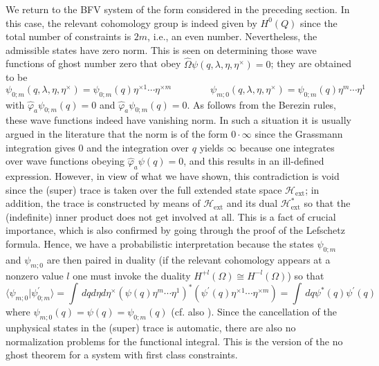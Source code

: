 \documentclass[a4paper,10pt]{article}
\begin{document}
We return to the BFV system of the form considered in the preceding section. In this 
case, the relevant cohomology group is indeed given by $H^0(Q)$ since the total number of 
constraints is $2m$, i.e., an even number. Nevertheless, the admissible states have zero 
norm. This is seen on determining those wave functions of ghost number zero that obey 
$\hat{\Omega}\psi(q,\lambda,\eta,\eta^{\times})=0$; they are obtained to be
\begin{equation}
\psi_{0;m}(q,\lambda,\eta,\eta^{\times})=\psi_{0;m}(q)\eta^{\times1}\cdots\eta^{\times 
m}\qquad\qquad
\psi_{m;0}(q,\lambda,\eta,\eta^{\times})=\psi_{0;m}(q)\eta^m\cdots\eta^1
\end{equation}
with $\hat{\varphi}_a\psi_{0;m}(q)=0$ and $\hat{\varphi}_a\psi_{0;m}(q)=0$. As follows 
from the Berezin rules, these wave functions indeed have vanishing norm. In such a 
situation it is usually argued in the literature that the norm is of the form 
$0\cdot\infty$ since the Grassmann integration gives $0$ and the integration over $q$ 
yields $\infty$ because one integrates over wave functions obeying 
$\hat{\varphi}_a\psi(q)=0$, and this results in an ill-defined expression. However, in view of what 
we have shown, this contradiction is void since the (super) trace is taken over the full 
extended state space $\mathcal{H}_{\mathrm{ext}}$; in addition, the trace is constructed 
by means of $\mathcal{H}_{\mathrm{ext}}$ and its dual $\mathcal{H}^{\ast}_{\mathrm{ext}}$ 
so that the (indefinite) inner product does not get involved at all. This is a fact of 
crucial importance, which is also confirmed by going through the proof of the Lefschetz 
formula.  Hence, we have a probabilistic interpretation because the states $\psi_{0;m}$ 
and $\psi_{m;0}$ are then paired in duality (if the relevant cohomology appears at a 
nonzero value $l$ one must invoke the duality $H^{+l}(\Omega)\cong H^{-l}(\Omega)$) so 
that
\begin{equation}
\langle\psi_{m;0}|\psi^{\prime}_{0;m}\rangle=\int\,dqd\eta 
d\eta^{\times}(\psi(q)\eta^m\cdots\eta^1)^{\ast}(\psi^{\prime}(q)\eta^{\times1}\cdots\eta
^{\times m})=\int\,dq\psi^{\ast}(q)\psi^{\prime}(q)
\end{equation}
where $\psi_{m;0}(q)=\psi(q)=\psi_{0;m}(q)$ (cf. also \cite{Mcmu 94}). Since the 
cancellation of the unphysical states in the (super) trace is automatic, there are also 
no normalization problems for the functional integral. This is the version of the no 
ghost theorem for a system with first class constraints.
\end{document}
